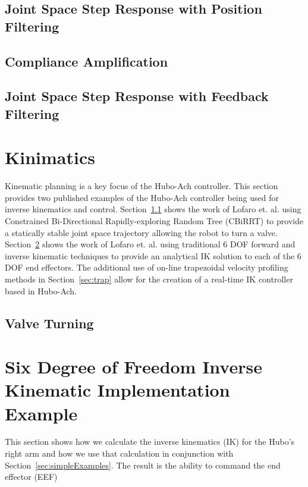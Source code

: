 	\subsection{Joint Space Step Response with Position Filtering}\label{sec:singlejointFilter}
		
	\subsection{Compliance Amplification}\label{sec:singlejointRefComplience}
		
	\subsection{Joint Space Step Response with Feedback Filtering}\label{sec:singlejointEnc}
		

\section{Kinimatics}\label{sec:hubo-ach-kinimatics}
Kinematic planning is a key focus of the Hubo-Ach controller.
This section provides two published examples of the Hubo-Ach controller being used for inverse kinematics and control.
Section~\ref{sec:valve} shows the work of Lofaro et. al. \cite{lofaroTePRA2013Valve} using Constrained Bi-Directional Rapidly-exploring Random Tree (CBiRRT) to provide a statically stable joint space trajectory allowing the robot to turn a valve.
Section~\ref{sec:6dofik} shows the work of Lofaro et. al. \cite{lofaroTePRA2013HuboAch} using traditional 6 DOF forward and inverse kinematic techniques to provide an analytical IK solution to each of the 6 DOF end effectors.
The additional use of on-line trapezoidal velocity profiling methods in Section~\ref{sec:trap} allow for the creation of a real-time IK controller based in Hubo-Ach.


\subsection{Valve Turning}\label{sec:valve}
	



\section{Six Degree of Freedom Inverse Kinematic Implementation Example}\label{sec:6dofik}
This section shows how we calculate the inverse kinematics (IK) for the Hubo's right arm and how we use that calculation in conjunction with Section~\ref{sec:simpleExamples}.  The result is the ability to command the end effector (EEF)

